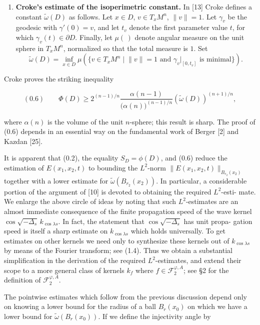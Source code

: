 \begin{enumerate}
\item \textbf{Croke's estimate of the isoperimetric constant.} In [13] Croke defines a
constant $\widetilde{\omega}(D)$ as follows. Let $x\in D$, $v\in T_xM^n$, $\lVert v\rVert=1$. Let $\gamma_v$ be the
geodesic with $\gamma'(0)=v$, and let $t_v$ denote the first parameter value $t$, for which
$\gamma_v(t)\in \partial D$. Finally, let $\mu(\,)$ denote angular measure on the unit sphere in
$T_xM^n$, normalized so that the total measure is $1$. Set
\begin{equation}
\widetilde{\omega}(D)=\inf_{x\in D}\mu(\{v\in T_xM^n\mid \lVert v\rVert=1 \text{ and } \gamma_v\lvert_{[0,t_v]} \text{ is minimal}\}).
\tag{0.5}
\end{equation}
\end{enumerate}

Croke proves the striking inequality

\begin{equation}
(0.6)\qquad \Phi(D) \ge 2^{(n-1)/n}\frac{\alpha(n-1)}{\bigl(\alpha(n)\bigr)^{(n-1)/n}}
(\widetilde{\omega}(D))^{(n+1)/n},
\end{equation}

where $\alpha(n)$ is the volume of the unit $n$-sphere; this result is sharp. The proof of
(0.6) depends in an essential way on the fundamental work of Berger [2] and
Kazdan [25].

It is apparent that (0.2), the equality $S_D=\phi(D)$, and (0.6) reduce the
estimation of $E(x_1,x_2,t)$ to bounding the $L^2$-norm $\lVert E(x_1,x_2,t)\rVert_{B_{r_2}(x_2)}$
together with a lower estimate for $\widetilde{\omega}(B_{r_2}(x_2))$. In particular, a considerable
portion of the argument of [10] is devoted to obtaining the required $L^2$-esti-
mate. We enlarge the above circle of ideas by noting that such $L^2$-estimates are
an almost immediate consequence of the finite propagation speed of the wave
kernel $\cos \sqrt{-\Delta_s}\, k_{\cos\lambda s}$. In fact, the statement that $\cos \sqrt{-\Delta_s}$ has unit propa-
gation speed is itself a sharp estimate on $k_{\cos\lambda s}$ which holds universally. To get
estimates on other kernels we need only to synthesize these kernels out of
$k_{\cos\lambda s}$ by means of the Fourier transform; see (1.4). Thus we obtain a
substantial simplification in the derivation of the required $L^2$-estimates, and
extend their scope to a more general class of kernels $k_f$ where $f \in \mathcal{F}_2^{\varphi,A}$; see \S 2
for the definition of $\mathcal{F}_2^{\varphi,A}$.

The pointwise estimates which follow from the previous discussion depend
only on knowing a lower bound for the radius of a ball $B_r(x_0)$ on which we
have a lower bound for $\widetilde{\omega}(B_r(x_0))$. If we define the injectivity angle by

